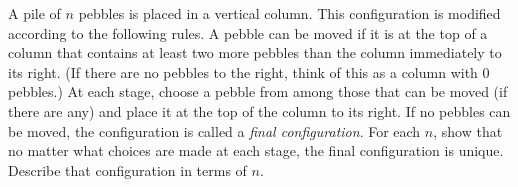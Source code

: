 A pile of $n$ pebbles is placed in a vertical column. This configuration is modified according to the following rules. A pebble can be moved if it is at the top of a column that contains at least two more pebbles than the column immediately to its right. (If there are no pebbles to the right, think of this as a column with $0$ pebbles.) At each stage, choose a pebble from among those that can be moved (if there are any) and place it at the top of the column to its right. If no pebbles can be moved, the configuration is called a \emph{final configuration}. For each $n$, show that no matter what choices are made at each stage, the final configuration is unique. Describe that configuration in terms of $n$.
